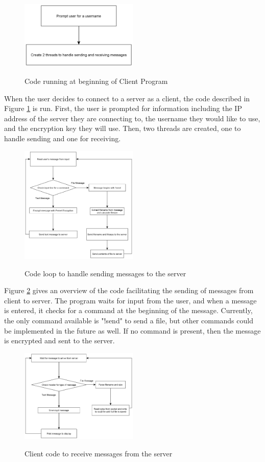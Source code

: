 \documentclass{article}
\begin{document}
\begin{figure}[h]
\caption{Code running at beginning of Client Program}
\centering
\includegraphics[width=0.5\textwidth]{media/clientFlowchart2.png}
\label{client2}
\end{figure}

When the user decides to connect to a server as a client, the code described in Figure \ref{client2} is run. First, the user is prompted for information including the IP address of the server they are connecting to, the username they would like to use, and the encryption key they will use. Then, two threads are created, one to handle sending and one for receiving.

\begin{figure}[h]
\caption{Code loop to handle sending messages to the server}
\centering
\includegraphics[width=0.5\textwidth]{media/clientFlowchart1.png}
\label{client1}
\end{figure}

Figure \ref{client1} gives an overview of the code facilitating the sending of messages from client to server. The program waits for input from the user, and when a message is entered, it checks for a command at the beginning of the message. Currently, the only command available is "!send" to send a file, but other commands could be implemented in the future as well. If no command is present, then the message is encrypted and sent to the server.

\begin{figure}[h]
\caption{Client code to receive messages from the server}
\centering
\includegraphics[width=0.5\textwidth]{media/clientFlowchart3.png}
\label{client3}
\end{figure}
\end{document}
